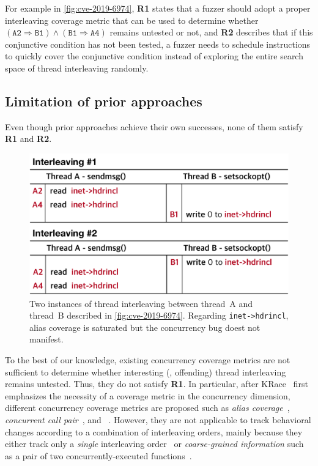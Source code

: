For example in \autoref{fig:cve-2019-6974}, \textbf{R1} states that a
fuzzer should adopt a proper interleaving coverage metric that can be
used to determine whether
$(\texttt{A2} \Rightarrow \texttt{B1}) \wedge (\texttt{B1} \Rightarrow
\texttt{A4})$ remains untested or not, and \textbf{R2} describes that
if this conjunctive condition has not been tested, a fuzzer needs to
schedule instructions to quickly cover the conjunctive condition
instead of exploring the entire search space of thread interleaving
randomly.






\subsection{Limitation of prior approaches}
\label{ss:existingapproaches}

Even though prior approaches achieve their own successes, none of them
satisfy \textbf{R1} and \textbf{R2}.

%
\begin{figure}[t]
  \centering
  \includegraphics[width=0.95\linewidth]{fig/alias-coverage.pdf}
  \caption{Two instances of thread interleaving between thread~A and
    thread~B described in \autoref{fig:cve-2019-6974}. Regarding
    \texttt{inet->hdrincl}, alias coverage is saturated but the
    concurrency bug doest not manifest.}
  \label{fig:alias-coverage}
\end{figure}
%
To the best of our knowledge, existing concurrency coverage metrics
are not sufficient to determine whether interesting (\ie, offending)
thread interleaving remains untested. Thus, they do not satisfy
\textbf{R1}.
%
In particular, after KRace~\cite{krace} first emphasizes the necessity
of a coverage metric in the concurrency dimension, different
concurrency coverage metrics are proposed such as \textit{alias
  coverage}~\cite{krace}, \textit{concurrent call
  pair}~\cite{conzzer}, and \textit{}~\cite{muzz}.
%
However, they are not applicable to track behavioral changes according
to a combination of interleaving orders, mainly because they either
track only a \textit{single} interleaving order~\cite{krace, muzz} or
\textit{coarse-grained information} such as a pair of two
concurrently-executed functions~\cite{conzzer}.

